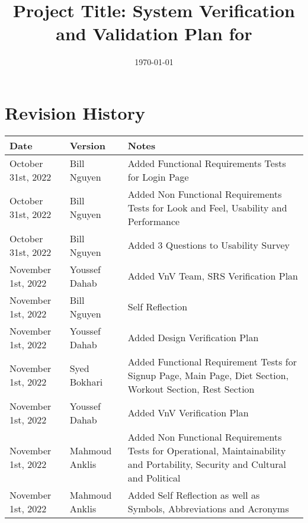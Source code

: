 \documentclass[12pt, titlepage]{article}
\begin{document}
\title{Project Title: System Verification and Validation Plan for \progname{}} 
\author{\authname}
\date{\today}

\maketitle


\section{Revision History}

\begin{tabularx}{\textwidth}{p{3cm}p{2cm}X}
	\toprule {\bf Date} & {\bf Version} & {\bf Notes}\\
	\midrule
	October 31st, 2022 & Bill Nguyen & Added Functional Requirements Tests for Login Page\\
	October 31st, 2022 & Bill Nguyen & Added Non Functional Requirements Tests for Look and Feel, Usability and Performance\\
	October 31st, 2022 & Bill Nguyen & Added 3 Questions to Usability Survey\\
	November 1st, 2022 & Youssef Dahab & Added VnV Team, SRS Verification Plan\\
	November 1st, 2022 & Bill Nguyen & Self Reflection\\
	November 1st, 2022 & Youssef Dahab & Added Design Verification Plan\\
	November 1st, 2022 & Syed Bokhari & Added Functional Requirement Tests for Signup Page, Main Page, Diet Section, Workout Section, Rest Section\\
	November 1st, 2022 & Youssef Dahab & Added VnV Verification Plan\\
	November 1st, 2022 & Mahmoud Anklis & Added Non Functional Requirements Tests for Operational, Maintainability and Portability, Security and Cultural and Political\\
	November 1st, 2022 & Mahmoud Anklis & Added Self Reflection as well as Symbols, Abbreviations and Acronyms\\
	\bottomrule
\end{tabularx}

\newpage

\tableofcontents

\listoftables
{}

\listoffigures
{}
\end{document}
